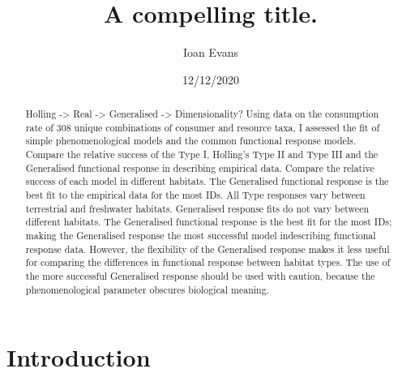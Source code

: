 \documentclass[11pt]{article}
\title{A compelling title.} %
\author{Ioan Evans}
\affil{Department of Life Sciences, Imperial College London}
\date{12/12/2020}
\newcommand\wordcount{}
\begin{document}
    \maketitle
    \wordcount

\newpage
\linenumbers

    \begin{abstract} %

        Holling -> Real -> Generalised -> Dimensionality?
        Using data on the consumption rate of 308 unique combinations of consumer and resource taxa, I assessed the fit of simple phenomenological models and the common functional response models.
        Compare the relative success of the Type I, Holling's Type II and Type III and the Generalised functional response in describing empirical data.
        Compare the relative success of each model in different habitats.
        The Generalised functional response is the best fit to the empirical data for the most IDs. All Type responses vary between terrestrial and freshwater habitats. Generalised response fits do not vary between different habitats.
        The Generalised functional response is the best fit for the most IDs; making the Generalised response the most successful model indescribing functional response data. However, the flexibility of the Generalised response makes it less useful for comparing the differences in functional response between habitat types. The use of the more successful Generalised response should be used with caution, because the phenomenological parameter obscures biological meaning. 
        
    \end{abstract}

    \section{Introduction} %
\end{document}
